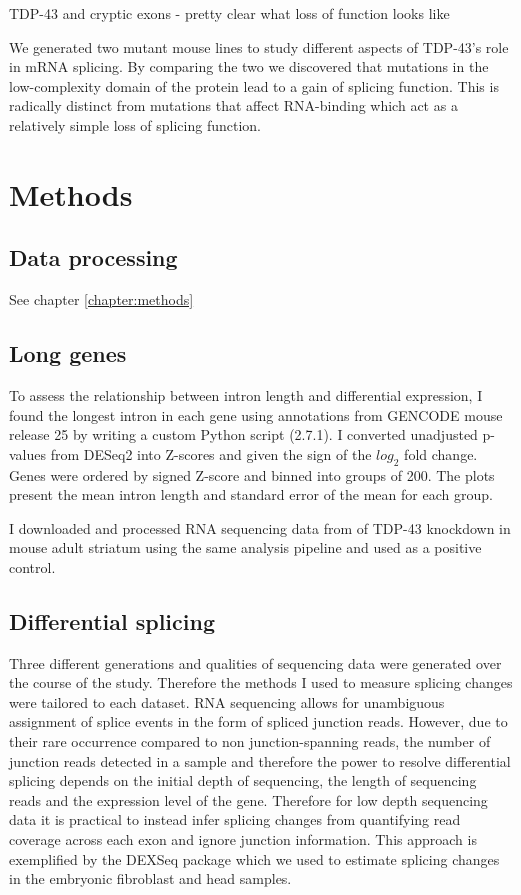 TDP-43 and cryptic exons - pretty clear what loss of function looks like

We generated two mutant mouse lines to study different aspects of TDP-43's role in mRNA splicing.
By comparing the two we discovered that mutations in the low-complexity domain of the protein lead to a gain of splicing function. This is radically distinct from mutations that affect RNA-binding which act as a relatively simple loss of splicing function.


\section{Methods}

\subsection{Data processing}
See chapter \autoref{chapter:methods}

\subsection{Long genes}
To assess the relationship between intron length and differential expression, I found the longest intron in each gene using annotations from GENCODE mouse release 25 \citep{Harrow2012} by writing a custom Python script (2.7.1). I converted unadjusted p-values from DESeq2 into Z-scores and given the sign of the $log_2$ fold change. Genes were ordered by signed Z-score and binned into groups of  200. The plots present the mean intron length and  standard error  of  the mean  for each group.  

I downloaded and processed RNA sequencing data from of TDP-43 knockdown in mouse adult striatum \citep{Polymenidou2011} using the same analysis pipeline and used as a positive control.


\subsection{Differential splicing}

Three different generations and qualities of sequencing data were generated over the course of the  study.  Therefore the methods I  used  to  measure  splicing  changes  were  tailored to each dataset. RNA sequencing allows for unambiguous assignment of splice events in the form of spliced junction reads. 
However, due to their rare occurrence compared to non junction-spanning reads, the number of junction reads detected in a sample and therefore the power to resolve differential splicing depends on the initial depth of sequencing, the length of sequencing reads and the expression level of the gene. Therefore for low depth sequencing data it is practical to instead infer splicing changes from quantifying read coverage across each exon and ignore junction information. This approach is exemplified by the DEXSeq package \citep{Anders2012} which we used to estimate splicing changes in the embryonic fibroblast and head samples.

